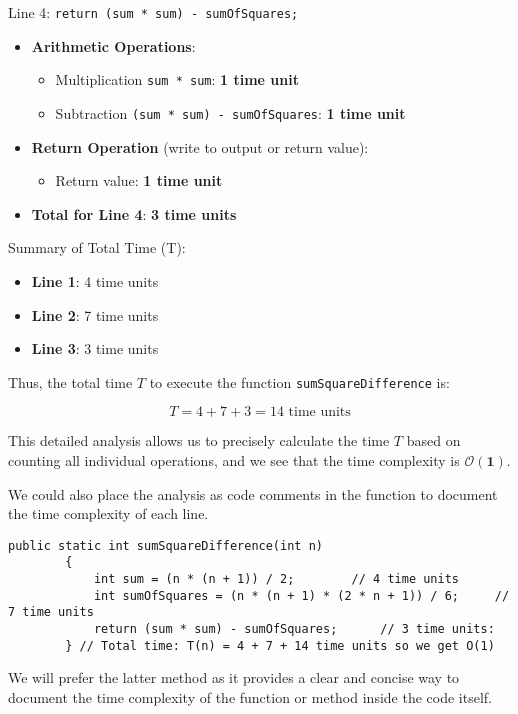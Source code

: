 \begin{example}
    Line 4: \texttt{return (sum * sum) - sumOfSquares;}
    \begin{itemize}
        \item \textbf{Arithmetic Operations}:
            \begin{itemize}
                \item Multiplication \texttt{sum * sum}: \textbf{1 time unit}
                \item Subtraction \texttt{(sum * sum) - sumOfSquares}: \textbf{1 time unit}
            \end{itemize}
        \item \textbf{Return Operation} (write to output or return value): 
            \begin{itemize}
                \item Return value: \textbf{1 time unit}
            \end{itemize}
        \item \textbf{Total for Line 4}: \textbf{3 time units}
    \end{itemize}

    Summary of Total Time (T):
    \begin{itemize}
        \item \textbf{Line 1}: 4 time units
        \item \textbf{Line 2}: 7 time units
        \item \textbf{Line 3}: 3 time units
    \end{itemize}

    Thus, the total time $T$ to execute the function \texttt{sumSquareDifference} is:

    \[
    T = 4 + 7 + 3 = 14 \text{ time units}
    \]

    This detailed analysis allows us to precisely calculate the time $T$ based on counting all individual operations, and we see that the time complexity is $\boldsymbol{\mathcal{O}(1)}$.

    We could also place the analysis as code comments in the function to document the time complexity of each line.

    \begin{lstlisting}[style=javaStyle, caption={Simple Function}, label={lst:java_simple_function2}]
        public static int sumSquareDifference(int n)
        {
            int sum = (n * (n + 1)) / 2;        // 4 time units
            int sumOfSquares = (n * (n + 1) * (2 * n + 1)) / 6;     // 7 time units
            return (sum * sum) - sumOfSquares;      // 3 time units:
        } // Total time: T(n) = 4 + 7 + 14 time units so we get O(1)
    \end{lstlisting}
    
We will prefer the latter method as it provides a clear and concise way to document the time complexity of the function or method inside the code itself.
        
\end{example}

